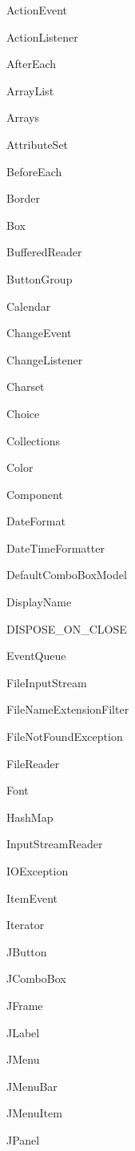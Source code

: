 \begin{DoxyCompactList}
\item Action\+Event\item Action\+Listener\item After\+Each\item Array\+List\item Arrays\item Attribute\+Set\item Before\+Each\item Border\item Box\item Buffered\+Reader\item Button\+Group\item Calendar\item Change\+Event\item Change\+Listener\item Charset\item Choice\item Collections\item Color\item Component\item Date\+Format\item Date\+Time\+Formatter\item Default\+Combo\+Box\+Model\item Display\+Name\item D\+I\+S\+P\+O\+S\+E\+\_\+\+O\+N\+\_\+\+C\+L\+O\+SE\item Event\+Queue\item File\+Input\+Stream\item File\+Name\+Extension\+Filter\item File\+Not\+Found\+Exception\item File\+Reader\item Font\item Hash\+Map\item Input\+Stream\+Reader\item I\+O\+Exception\item Item\+Event\item Iterator\item J\+Button\item J\+Combo\+Box\item J\+Frame\item J\+Label\item J\+Menu\item J\+Menu\+Bar\item J\+Menu\+Item\item J\+Panel\begin{DoxyCompactList}

\end{DoxyCompactList}
\end{DoxyCompactList}
